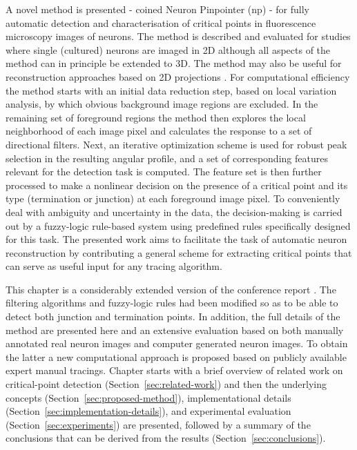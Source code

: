 A novel method is presented - coined Neuron Pinpointer (\gls{np}) - for fully automatic detection and characterisation of critical points in fluorescence microscopy images of neurons. The method is described and evaluated for studies where single (cultured) neurons are imaged in 2D although all aspects of the method can in principle be extended to 3D. The method may also be useful for reconstruction approaches based on 2D projections \cite{zhou2015neuron}. For computational efficiency the method starts with an initial data reduction step, based on local variation analysis, by which obvious background image regions are excluded. In the remaining set of foreground regions the method then explores the local neighborhood of each image pixel and calculates the response to a set of directional filters. Next, an iterative optimization scheme is used for robust peak selection in the resulting angular profile, and a set of corresponding features relevant for the detection task is computed. The feature set is then further processed to make a nonlinear decision on the presence of a critical point and its type (termination or junction) at each foreground image pixel. To conveniently deal with ambiguity and uncertainty in the data, the decision-making is carried out by a fuzzy-logic rule-based system using predefined rules specifically designed for this task. The presented work aims to facilitate the task of automatic neuron reconstruction by contributing a general scheme for extracting critical points that can serve as useful input for any tracing algorithm.

This chapter is a considerably extended version of the conference report \cite{radojevic2014fuzzy}. The filtering algorithms and fuzzy-logic rules had been modified so as to be able to detect both junction and termination points. In addition, the full details of the method are presented here and an extensive evaluation based on both manually annotated real neuron images and computer generated neuron images. To obtain the latter a new computational approach is proposed based on publicly available expert manual tracings. Chapter starts with a brief overview of related work on critical-point detection (Section~\ref{sec:related-work}) and then the underlying concepts (Section~\ref{sec:proposed-method}), implementational details (Section~\ref{sec:implementation-details}), and experimental evaluation (Section~\ref{sec:experiments}) are presented, followed by a summary of the conclusions that can be derived from the results (Section~\ref{sec:conclusions}).

